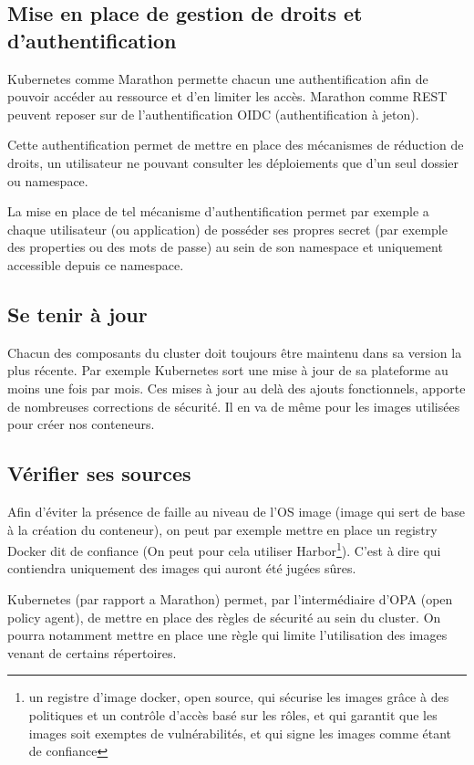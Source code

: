 \documentclass[11pt,fleqn]{book} %
\begin{document}
\subsection*{Mise en place de gestion de droits et d'authentification}
Kubernetes comme Marathon permette chacun une authentification afin de pouvoir accéder au ressource et d'en limiter les accès. Marathon comme REST peuvent reposer sur de l'authentification OIDC (authentification à jeton). \newline

Cette authentification permet de mettre en place des mécanismes de réduction de droits, un utilisateur ne pouvant consulter les déploiements que d'un seul dossier ou namespace.\newline

La mise en place de tel mécanisme d'authentification permet par exemple a chaque utilisateur (ou application) de posséder ses propres secret (par exemple des properties ou des mots de passe) au sein de son namespace et uniquement accessible depuis ce namespace.


\subsection*{Se tenir à jour}
Chacun des composants du cluster doit toujours être maintenu dans sa version la plus récente. Par exemple Kubernetes sort une mise à jour de sa plateforme au moins une fois par mois. Ces mises à jour au delà des ajouts fonctionnels, apporte de nombreuses corrections de sécurité. Il en va de même pour les images utilisées pour créer nos conteneurs.

\subsection*{Vérifier ses sources}
Afin d'éviter la présence de faille au niveau de l'OS image (image qui sert de base à la création du conteneur), on peut par exemple mettre en place un registry Docker dit de confiance (On peut pour cela utiliser Harbor\footnote{un registre d'image docker, open source, qui sécurise les images grâce à des politiques et un contrôle d'accès basé sur les rôles, et qui garantit que les images soit exemptes de vulnérabilités, et qui signe les images comme étant de confiance}). C'est à dire qui contiendra uniquement des images qui auront été jugées sûres.\newline

Kubernetes (par rapport a Marathon) permet, par l'intermédiaire d'OPA (open policy agent), de mettre en place des règles de sécurité au sein du cluster. On pourra notamment mettre en place une règle qui limite l'utilisation des images venant de certains répertoires.
\end{document}
